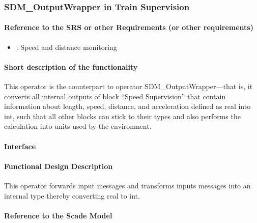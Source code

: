 \subsubsection{SDM\_OutputWrapper in Train Supervision}

\paragraph{Reference to the SRS or other Requirements (or other requirements)}
\begin{itemize}
	\item \cite[Chapt.~3.13]{subset-026}: Speed and distance monitoring 
\end{itemize}

\paragraph{Short description of the functionality}
This operator is the counterpart to operator SDM\_OutputWrapper---that is, it converts all internal outputs of block ``Speed Supervision'' that contain information about length, speed, distance, and acceleration defined as real into int, such that all other blocks can stick to their types and also performs the calculation into units used by the environment.

\paragraph{Interface}

\paragraph{Functional Design Description}
This operator forwards input messages and transforms inputs messages into an internal type thereby converting real to int.
  
\paragraph{Reference to the Scade Model}
